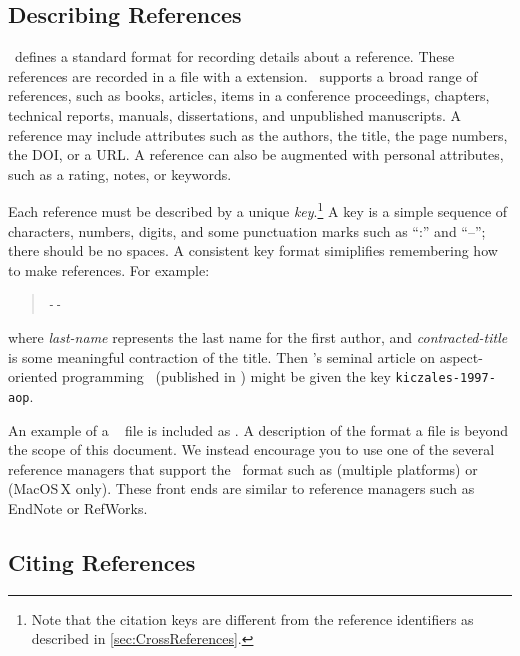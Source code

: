 \subsection{Describing References}

\BibTeX\ defines a standard format for recording details about a
reference.  These references are recorded in a file with a
 extension.  \BibTeX\ supports a broad range of
references, such as books, articles, items in a conference proceedings,
chapters, technical reports, manuals, dissertations, and unpublished
manuscripts. 
A reference may include attributes such as the authors,
the title, the page numbers, the \ac{DOI}, or a \ac{URL}.  A reference
can also be augmented with personal attributes, such as a rating,
notes, or keywords.

Each reference must be described by a unique \emph{key}.\footnote{%
    Note that the citation keys are different from the reference
    identifiers as described in \autoref{sec:CrossReferences}.}
A key is a simple sequence of characters, numbers, digits, and some
punctuation marks such as ``:'' and ``--''; there should be no spaces. 
A consistent key format simiplifies remembering how to make references. 
For example:
\begin{quote}
   \texttt{-}\texttt{-}
\end{quote}
where \emph{last-name} represents the last name for the first author,
and \emph{contracted-title} is some meaningful contraction of the
title.  Then \citeauthor{kiczales-1997-aop}'s seminal article on
aspect-oriented programming~\cite{kiczales-1997-aop} (published in
\citeyear{kiczales-1997-aop}) might be given the key
\texttt{kiczales-1997-aop}.

An example of a \BibTeX\  file is included as
.  A description of the format a 
file is beyond the scope of this document.  We instead encourage
you to use one of the several reference managers that support the
\BibTeX\ format such as
 (multiple platforms) or
 (MacOS\,X only). 
These front ends are similar to reference managers such as
EndNote or RefWorks.


\subsection{Citing References}

